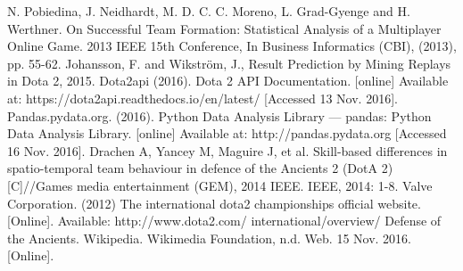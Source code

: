 \documentclass[letterpaper, 10 pt, conference]{ieeeconf}  %
\begin{document}
\begin{thebibliography}{99}
 N. Pobiedina, J. Neidhardt, M. D. C. C. Moreno, L. Grad-Gyenge and H. Werthner. On Successful Team Formation: Statistical Analysis of a Multiplayer Online Game. 2013 IEEE 15th Conference, In Business Informatics (CBI), (2013), pp. 55-62.
 Johansson, F. and Wikström, J., Result Prediction by Mining Replays in Dota 2, 2015.
 Dota2api (2016). Dota 2 API Documentation. [online] Available at: https://dota2api.readthedocs.io/en/latest/ [Accessed 13 Nov. 2016].
 Pandas.pydata.org. (2016). Python Data Analysis Library — pandas: Python Data Analysis Library. [online] Available at: http://pandas.pydata.org [Accessed 16 Nov. 2016].
 Drachen A, Yancey M, Maguire J, et al. Skill-based differences in spatio-temporal team behaviour in defence of the Ancients 2 (DotA 2)[C]//Games media entertainment (GEM), 2014 IEEE. IEEE, 2014: 1-8.
 Valve Corporation. (2012) The international dota2 championships official website. [Online]. Available: http://www.dota2.com/ international/overview/
 Defense of the Ancients. Wikipedia. Wikimedia Foundation, n.d. Web. 15 Nov. 2016. [Online].

\end{thebibliography}
\end{document}
